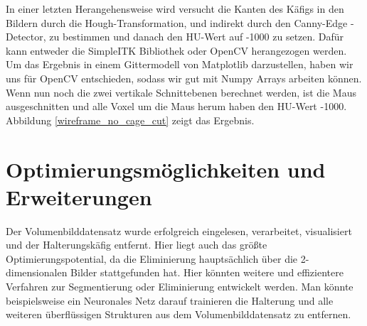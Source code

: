 \documentclass[conference]{IEEEtran}
\begin{document}
In einer letzten Herangehensweise wird versucht die Kanten des Käfigs in den Bildern durch die Hough-Transformation\cite{hough_transformation}, und indirekt durch den Canny-Edge -Detector\cite{Canny-Edge-Detector}, zu bestimmen und danach den HU-Wert auf -1000 zu setzen.
Dafür kann entweder die SimpleITK Bibliothek oder OpenCV herangezogen werden. Um das Ergebnis in einem Gittermodell von Matplotlib darzustellen, haben wir uns für OpenCV entschieden, sodass wir gut mit Numpy Arrays arbeiten können. Wenn  nun noch die zwei vertikale Schnittebenen berechnet werden, ist die Maus ausgeschnitten und alle Voxel um die Maus herum haben den HU-Wert -1000. Abbildung \ref{wireframe_no_cage_cut} zeigt das Ergebnis.

\section{Optimierungsmöglichkeiten und Erweiterungen}
Der Volumenbilddatensatz wurde erfolgreich eingelesen, verarbeitet, visualisiert und der Halterungskäfig entfernt. Hier liegt auch das größte Optimierungspotential, da die Eliminierung hauptsächlich über die 2-dimensionalen Bilder stattgefunden hat. Hier könnten weitere und effizientere Verfahren zur Segmentierung oder Eliminierung entwickelt werden. Man könnte beispielsweise ein Neuronales Netz darauf trainieren die Halterung und alle weiteren überflüssigen Strukturen aus dem Volumenbilddatensatz zu entfernen.




\end{document}
